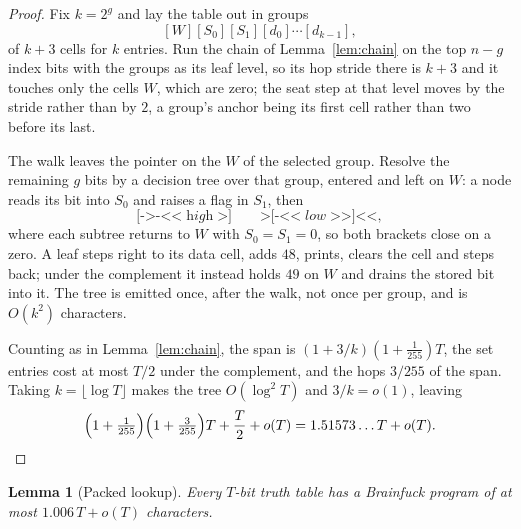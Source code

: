 \documentclass[11pt]{article}
\newtheorem{lemma}[theorem]{Lemma}
\theoremstyle{remark}
\begin{document}
\begin{proof}
Fix $k=2^{g}$ and lay the table out in groups
\[
  [W][S_0][S_1][d_0]\cdots[d_{k-1}],
\]
of $k+3$ cells for $k$ entries.  Run the chain of Lemma~\ref{lem:chain} on
the top $n-g$ index bits with the groups as its leaf level, so its hop
stride there is $k+3$ and it touches only the cells $W$, which are zero; the
seat step at that level moves by the stride rather than by $2$, a group's
anchor being its first cell rather than two before its last.

The walk leaves the pointer on the $W$ of the selected group.  Resolve the
remaining $g$ bits by a decision tree over that group, entered and left on
$W$: a node reads its bit into $S_0$ and raises a flag in $S_1$, then
\[
  \texttt{[->-<<}\;\textit{high}\;\texttt{>]}\qquad
  \texttt{>[-<<}\;\textit{low}\;\texttt{>>]<<},
\]
where each subtree returns to $W$ with $S_0=S_1=0$, so both brackets close
on a zero.  A leaf steps right to its data cell, adds $48$, prints, clears
the cell and steps back; under the complement it instead holds $49$ on $W$
and drains the stored bit into it.  The tree is emitted once, after the
walk, not once per group, and is $O(k^2)$ characters.

Counting as in Lemma~\ref{lem:chain}, the span is
$(1+3/k)(1+\frac1{255})T$, the set entries cost at most $T/2$ under the
complement, and the hops $3/255$ of the span.  Taking $k=\lfloor\log
T\rfloor$ makes the tree $O(\log^2T)$ and $3/k=o(1)$, leaving
\[
  \Bigl(1+\tfrac1{255}\Bigr)\Bigl(1+\tfrac3{255}\Bigr)T+\frac T2+o(T)
  =1.51573\ldots T+o(T).\qedhere
\]
\end{proof}

\begin{lemma}[Packed lookup]\label{lem:pack}
Every $T$-bit truth table has a Brainfuck program of at most
$1.006\,T+o(T)$ characters.
\end{lemma}
\end{document}
